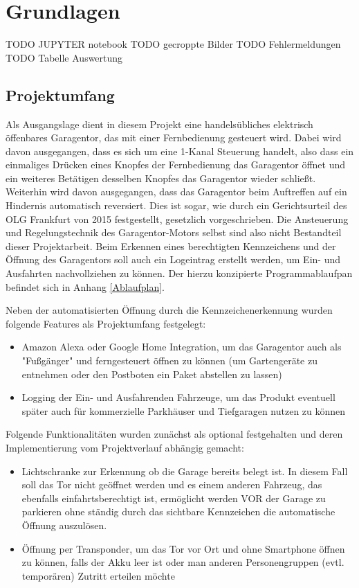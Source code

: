 \chapter{Grundlagen}
TODO JUPYTER notebook
TODO gecroppte Bilder
TODO Fehlermeldungen
TODO Tabelle Auswertung
\section{Projektumfang}
Als Ausgangslage dient in diesem Projekt eine handelsübliches elektrisch öffenbares Garagentor, das mit einer Fernbedienung gesteuert wird. Dabei wird davon ausgegangen, dass es sich um eine 1-Kanal Steuerung handelt, also dass ein einmaliges Drücken eines Knopfes der Fernbedienung das Garagentor öffnet und ein weiteres Betätigen desselben Knopfes das Garagentor wieder schließt. Weiterhin wird davon ausgegangen, dass das Garagentor beim Auftreffen auf ein Hindernis automatisch reversiert. Dies ist sogar, wie durch ein Gerichtsurteil des OLG Frankfurt von 2015 festgestellt, gesetzlich vorgeschrieben.\autocite[Vgl.][]{olgfrankfurt} %
Die Ansteuerung und Regelungstechnik des Garagentor-Motors selbst sind also nicht Bestandteil dieser Projektarbeit.
Beim Erkennen eines berechtigten Kennzeichens und der Öffnung des Garagentors soll auch ein Logeintrag erstellt werden, um Ein- und Ausfahrten nachvollziehen zu können. Der hierzu konzipierte Programmablaufpan befindet sich in Anhang \ref{Ablaufplan}.

Neben der automatisierten Öffnung durch die Kennzeichenerkennung wurden folgende Features als Projektumfang festgelegt:

\begin{itemize}
\item Amazon Alexa oder Google Home Integration, um das Garagentor auch als "Fußgänger" und ferngesteuert öffnen zu können (um Gartengeräte zu entnehmen oder den Postboten ein Paket abstellen zu lassen)




\item Logging der Ein- und Ausfahrenden Fahrzeuge, um das Produkt eventuell später auch für kommerzielle Parkhäuser und Tiefgaragen nutzen zu können
\end{itemize}
Folgende Funktionalitäten wurden zunächst als optional festgehalten und deren Implementierung vom Projektverlauf abhängig gemacht:
\begin{itemize}
\item Lichtschranke zur Erkennung ob die Garage bereits belegt ist. In diesem Fall soll das Tor nicht geöffnet werden und es einem anderen Fahrzeug, das ebenfalls einfahrtsberechtigt ist, ermöglicht werden VOR der Garage zu parkieren ohne ständig durch das sichtbare Kennzeichen die automatische Öffnung auszulösen.

\item Öffnung per Transponder, um das Tor vor Ort und ohne Smartphone öffnen zu können, falls der Akku leer ist oder man anderen Personengruppen (evtl. temporären) Zutritt erteilen möchte


\end{itemize}

